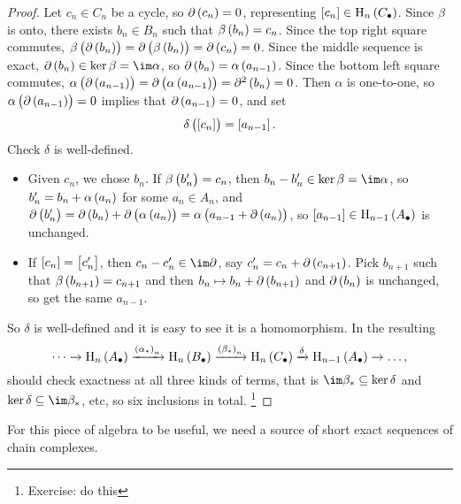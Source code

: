 \begin{proof}
Let $ c_n \in C_n $ be a cycle, so $ \da\br{c_n} = 0 $, representing $ \sbr{c_n} \in \H_n\br{C_\bullet} $. Since $ \beta $ is onto, there exists $ b_n \in B_n $ such that $ \beta\br{b_n} = c_n $. Since the top right square commutes, $ \beta\br{\da\br{b_n}} = \da\br{\beta\br{b_n}} = \da\br{c_n} = 0 $. Since the middle sequence is exact, $ \da\br{b_n} \in \ker \beta = \im \alpha $, so $ \da\br{b_n} = \alpha\br{a_{n - 1}} $. Since the bottom left square commutes, $ \alpha\br{\da\br{a_{n - 1}}} = \da\br{\alpha\br{a_{n - 1}}} = \da^2\br{b_n} = 0 $. Then $ \alpha $ is one-to-one, so $ \alpha\br{\da\br{a_{n - 1}}} = 0 $ implies that $ \da\br{a_{n - 1}} = 0 $, and set
$$ \delta\br{\sbr{c_n}} = \sbr{a_{n - 1}}. $$
Check $ \delta $ is well-defined.
\begin{itemize}
\item Given $ c_n $, we chose $ b_n $. If $ \beta\br{b_n'} = c_n $, then $ b_n - b_n' \in \ker \beta = \im \alpha $, so $ b_n' = b_n + \alpha\br{a_n} $ for some $ a_n \in A_n $, and $ \da\br{b_n'} = \da\br{b_n} + \da\br{\alpha\br{a_n}} = \alpha\br{a_{n - 1} + \da\br{a_n}} $, so $ \sbr{a_{n - 1}} \in \H_{n - 1}\br{A_\bullet} $ is unchanged.
\item If $ \sbr{c_n} = \sbr{c_n'} $, then $ c_n - c_n' \in \im \da $, say $ c_n' = c_n + \da\br{c_{n + 1}} $. Pick $ b_{n + 1} $ such that $ \beta\br{b_{n + 1}} = c_{n + 1} $ and then $ b_n \mapsto b_n + \da\br{b_{n + 1}} $ and $ \da\br{b_n} $ is unchanged, so get the same $ a_{n - 1} $.
\end{itemize}
So $ \delta $ is well-defined and it is easy to see it is a homomorphism. In the resulting
$$ \dots \to \H_n\br{A_\bullet} \xrightarrow{\br{\alpha_*}_n} \H_n\br{B_\bullet} \xrightarrow{\br{\beta_*}_n} \H_n\br{C_\bullet} \xrightarrow{\delta} \H_{n - 1}\br{A_\bullet} \to \dots, $$
should check exactness at all three kinds of terms, that is $ \im \beta_* \subseteq \ker \delta $ and $ \ker \delta \subseteq \im \beta_* $, etc, so six inclusions in total. \footnote{Exercise: do this}
\end{proof}

For this piece of algebra to be useful, we need a source of short exact sequences of chain complexes.

